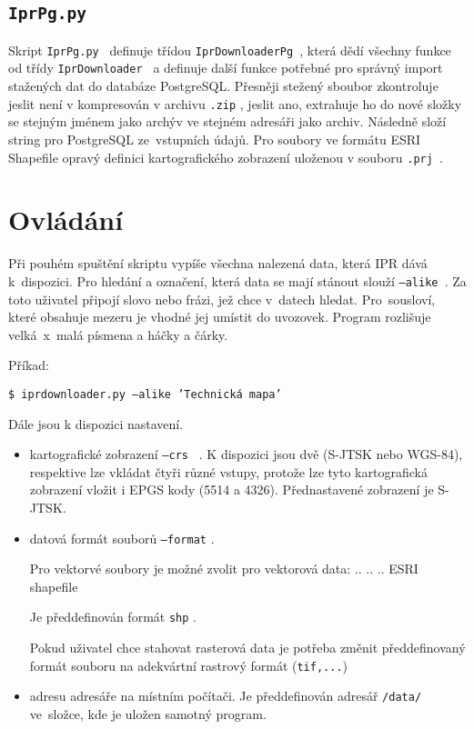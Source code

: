 \subsection{{\tt IprPg.py}}
Skript {\tt IprPg.py } definuje třídou {\tt IprDownloaderPg }, která dědí 
všechny funkce od třídy {\tt IprDownloader } a definuje další funkce potřebné pro 
správný import stažených dat do databáze PostgreSQL. 
Přesněji stežený sboubor zkontroluje jeslit není v kompresován v archivu 
{\tt *.zip} , jeslit ano, extrahuje ho do nové složky se stejným jménem jako
archýv ve stejném adresáři jako archiv. Následně složí string pro PostgreSQL 
ze~vstupních údajů. Pro soubory ve formátu ESRI Shapefile opravý definici 
kartografického zobrazení uloženou v souboru {\tt *.prj }. 


\section{Ovládání}
Při pouhém spuštění skriptu vypíše všechna nalezená data, která IPR dává 
k~dispozici. Pro hledání a označení, která data se mají stánout slouží 
{\tt ---alike }. Za toto uživatel připojí slovo nebo frázi, jež chce v~datech
hledat. Pro~sousloví, které obsahuje mezeru je vhodné jej umístit do uvozovek. 
Program rozlišuje velká~x~malá písmena a háčky a čárky.

Příkad:

{\tt \$ iprdownloader.py ---alike 'Technická mapa'}
  

Dále jsou k dispozici nastavení.
\begin{itemize}
    \item kartografické zobrazení {\tt ---crs } . K dispozici jsou dvě
     (S-JTSK nebo WGS-84), respektive lze vkládat čtyři různé vstupy, protože 
     lze tyto kartografická zobrazení vložit i EPGS kody (5514 a 4326). 
     Přednastavené zobrazení je S-JTSK.
    \item datová formát souborů {\tt ---format} .
    
    Pro vektorvé soubory je možné zvolit pro vektorová data:
          ..   
          ..   
          ..                    
          ESRI shapefile
        
    Je předdefinován formát {\tt shp} .
         
    Pokud uživatel chce stahovat rasterová data je potřeba změnit předdefinovaný
    formát souboru na adekvártní rastrový formát ({\tt tif,...})
    
    \item adresu adresáře na místním počítači. Je předdefinován adresář 
    {\tt /data/} ve~složce, kde je uložen samotný program.     
\end{itemize}

